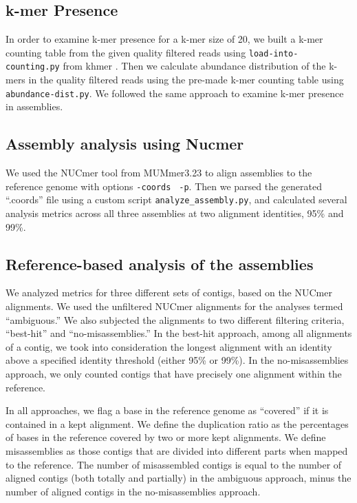 \documentclass[10pt,a4paper,twocolumn]{article}
\begin{document}

\subsection*{k-mer Presence}
In order to examine k-mer presence for a k-mer size of 20, we built a
k-mer counting table from the given quality filtered reads using
{\tt{load-into-counting.py}} from khmer \cite{khmer2016}. Then we
calculate abundance distribution of the k-mers in the quality filtered
reads using the pre-made k-mer counting table using
{\tt{abundance-dist.py}}. We followed the same approach to examine
k-mer presence in assemblies.

\subsection*{Assembly analysis using Nucmer}

We used the NUCmer tool from MUMmer3.23 \cite{mummer3.0} to align
assemblies to the reference genome with options {\tt \--coords} {\tt
  -p}. Then we parsed the generated ``.coords'' file using a custom
script {\tt{analyze\_assembly.py}}, and calculated several analysis
metrics across all three assemblies at two alignment identities, 95\% and 99\%.

\subsection*{Reference-based analysis of the assemblies}

We analyzed metrics for three different sets of contigs, based on the
NUCmer alignments.  We used the unfiltered NUCmer alignments for the
analyses termed ``ambiguous.''  We also subjected the alignments to
two different filtering criteria, ``best-hit'' and
``no-misassemblies.''
In the best-hit approach, among all alignments of a contig, we took
into consideration the longest alignment with an identity above a specified
identity threshold (either 95\% or 99\%).
In the no-misassemblies approach, we only counted contigs that have
precisely one alignment within the reference.

In all approaches, we flag a base in the reference genome as
``covered'' if it is contained in a kept alignment.  We define the
duplication ratio as the percentages of bases in the reference covered
by two or more kept alignments. We define misassemblies as
those contigs that are divided into different parts when mapped to the
reference.  The number of misassembled contigs is equal to the number
of aligned contigs (both totally and partially) in the ambiguous
approach, minus the number of aligned contigs in the no-misassemblies
approach.
\end{document}
